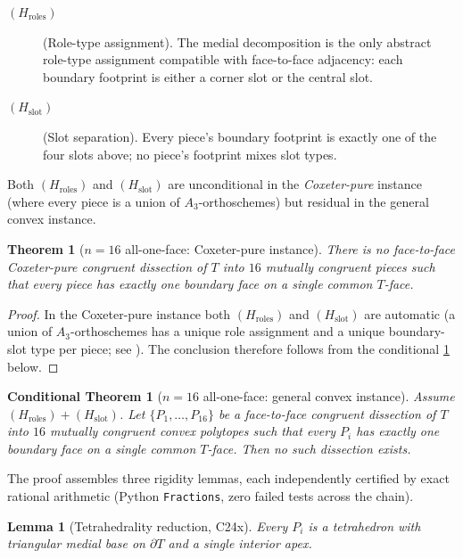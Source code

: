 \documentclass[11pt,a4paper]{article}
\theoremstyle{plain}
\newtheorem{theorem}{Theorem}[section]
\newtheorem{lemma}[lemma]{Lemma}
\newtheorem{conditionaltheorem}[conditionaltheorem]{Conditional Theorem}
\theoremstyle{definition}
\theoremstyle{remark}
\newcommand{\Hroles}{H_{\mathrm{roles}}}
\newcommand{\Hslot}{H_{\mathrm{slot}}}
\begin{document}
\begin{description}
\item[$(\Hroles)$] (Role-type assignment).
  The medial decomposition is the only abstract role-type assignment
  compatible with face-to-face adjacency: each boundary footprint is either
  a corner slot or the central slot.
\item[$(\Hslot)$] (Slot separation).
  Every piece's boundary footprint is exactly one of the four slots above;
  no piece's footprint mixes slot types.
\end{description}

Both $(\Hroles)$ and $(\Hslot)$ are unconditional in the
\emph{Coxeter-pure} instance (where every piece is a union of
$A_{3}$-orthoschemes) but residual in the general convex instance.

\begin{theorem}[$n=16$ all-one-face: Coxeter-pure instance]\label{thm:n16-aof-coxeter}
There is no face-to-face Coxeter-pure congruent dissection of $T$ into
$16$ mutually congruent pieces such that every piece has exactly one
boundary face on a single common $T$-face.
\end{theorem}

\begin{proof}
In the Coxeter-pure instance both $(\Hroles)$ and $(\Hslot)$ are automatic
(a union of $A_{3}$-orthoschemes has a unique role assignment and a
unique boundary-slot type per piece; see ).  The
conclusion therefore follows from the conditional
\cref{thm:n16-aof-conditional} below.
\end{proof}

\begin{conditionaltheorem}[$n=16$ all-one-face: general convex instance]\label{thm:n16-aof-conditional}
Assume $(\Hroles) + (\Hslot)$.  Let $\{P_{1},\ldots,P_{16}\}$ be a
face-to-face congruent dissection of $T$ into $16$ mutually congruent
convex polytopes such that every $P_{i}$ has exactly one boundary face on a
single common $T$-face.  Then no such dissection exists.
\end{conditionaltheorem}

The proof assembles three rigidity lemmas, each independently certified by
exact rational arithmetic (Python \texttt{Fractions}, zero failed tests
across the chain).

\begin{lemma}[Tetrahedrality reduction, C24x]\label{lem:c24x}
Every $P_{i}$ is a tetrahedron with triangular medial base on $\partial T$
and a single interior apex.
\end{lemma}
\end{document}
